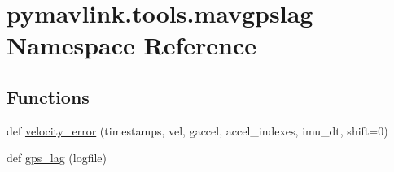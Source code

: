 \hypertarget{namespacepymavlink_1_1tools_1_1mavgpslag}{}\section{pymavlink.\+tools.\+mavgpslag Namespace Reference}
\label{namespacepymavlink_1_1tools_1_1mavgpslag}
\subsection*{Functions}
\begin{DoxyCompactItemize}
\item 
def \hyperlink{namespacepymavlink_1_1tools_1_1mavgpslag_ab86565b5a9f5c4a8ffd725b81faeb819}{velocity\+\_\+error} (timestamps, vel, gaccel, accel\+\_\+indexes, imu\+\_\+dt, shift=0)
\item 
def \hyperlink{namespacepymavlink_1_1tools_1_1mavgpslag_af4a2cfb91f46374a5585be6ab70d5f4e}{gps\+\_\+lag} (logfile)
\end{DoxyCompactItemize}
